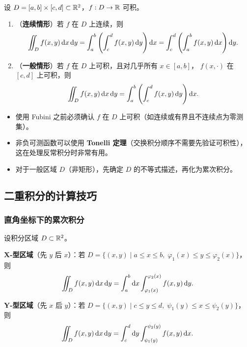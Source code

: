 \documentclass{ctexart}
\begin{document}
\begin{theorem}[Fubini]
  设 $D = [a,b] \times [c,d] \subset \mathbb{R}^2$，$f: D \to \mathbb{R}$ 可积。
  \begin{enumerate}
    \item（\textbf{连续情形}）若 $f$ 在 $D$ 上连续，则
      \[
        \iint_D f(x,y) \,\mathrm{d} x\,\mathrm{d} y
        = \int_a^b \left( \int_c^d f(x,y) \,\mathrm{d} y \right) \mathrm{d} x
        = \int_c^d \left( \int_a^b f(x,y) \,\mathrm{d} x \right) \mathrm{d} y.
      \]
    \item（\textbf{一般情形}）若 $f$ 在 $D$ 上可积，且对几乎所有 $x \in [a,b]$，
      $f(x,\cdot)$ 在 $[c,d]$ 上可积，则
      \[
        \iint_D f(x,y) \,\mathrm{d} x\,\mathrm{d} y
        = \int_a^b \left( \int_c^d f(x,y) \,\mathrm{d} y \right) \mathrm{d} x.
      \]
  \end{enumerate}
\end{theorem}

\begin{remark}
  \begin{itemize}
    \item 使用 Fubini 之前必须确认 $f$ 在 $D$ 上可积（如连续或有界且不连续点为零测集）。
    \item 非负可测函数可以使用 \textbf{Tonelli 定理}（交换积分顺序不需要先验证可积性），
      这在处理反常积分时非常有用。
    \item 对于一般区域 $D$（非矩形），先确定 $D$ 的不等式描述，再化为累次积分。
  \end{itemize}
\end{remark}

\subsection{二重积分的计算技巧}

\subsubsection*{直角坐标下的累次积分}

设积分区域 $D \subset \mathbb{R}^2$。

\textbf{X-型区域}（先 $y$ 后 $x$）：若 $D = \{(x,y) \mid a \le x \le b,\; \varphi_1(x) \le y \le \varphi_2(x)\}$，则
\[
  \iint_D f(x,y) \,\mathrm{d} x\,\mathrm{d} y
  = \int_a^b \mathrm{d} x \int_{\varphi_1(x)}^{\varphi_2(x)} f(x,y) \,\mathrm{d} y.
\]

\textbf{Y-型区域}（先 $x$ 后 $y$）：若 $D = \{(x,y) \mid c \le y \le d,\; \psi_1(y) \le x \le \psi_2(y)\}$，则
\[
  \iint_D f(x,y) \,\mathrm{d} x\,\mathrm{d} y
  = \int_c^d \mathrm{d} y \int_{\psi_1(y)}^{\psi_2(y)} f(x,y) \,\mathrm{d} x.
\]
\end{document}
